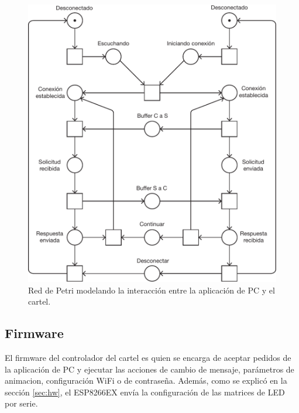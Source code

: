 \begin{figure}[htbp]
	\centering
	\includegraphics[width=0.8\linewidth]{imagenes/petri-net.pdf}
	\caption{Red de Petri modelando la interacción entre la aplicación de PC y el cartel.}
	\label{fig:petri-net}
\end{figure}

\subsection{Firmware}
El firmware del controlador del cartel es quien se encarga de aceptar pedidos de la aplicación de PC y ejecutar las acciones de cambio de mensaje, parámetros de animacion, configuración WiFi o de contraseña. Además, como se explicó en la sección \ref{sec:hw}, el ESP8266EX envía la configuración de las matrices de LED por serie.



